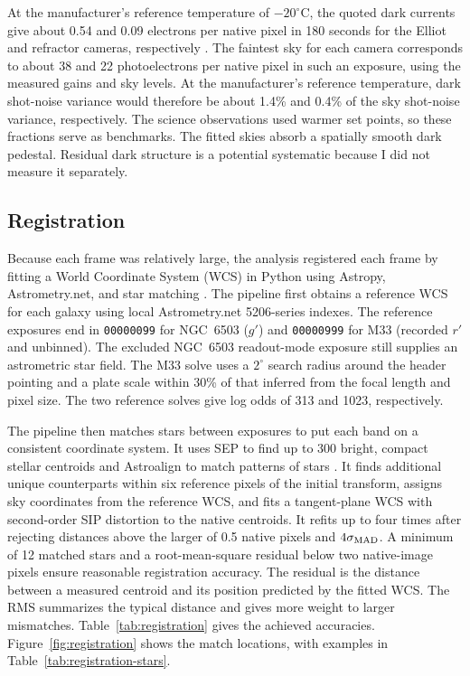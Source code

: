 At the manufacturer's reference temperature of $-20^{\circ}$C, the quoted dark currents give about 0.54 and 0.09 electrons per native pixel in 180 seconds for the Elliot and refractor cameras, respectively \citep{methQHY461,methQHY533}. The faintest sky for each camera corresponds to about 38 and 22 photoelectrons per native pixel in such an exposure, using the measured gains and sky levels. At the manufacturer's reference temperature, dark shot-noise variance would therefore be about 1.4\% and 0.4\% of the sky shot-noise variance, respectively. The science observations used warmer set points, so these fractions serve as benchmarks. The fitted skies absorb a spatially smooth dark pedestal. Residual dark structure is a potential systematic because I did not measure it separately.

\subsection{Registration}
\label{sec:registration}

Because each frame was relatively large, the analysis registered each frame by fitting a World Coordinate System (WCS) in Python using Astropy, Astrometry.net, and star matching \citep{methAstropy,methLang}. The pipeline first obtains a reference WCS for each galaxy using local Astrometry.net 5206-series indexes. The reference exposures end in \texttt{00000099} for NGC~6503 ($g'$) and \texttt{00000999} for M33 (recorded $r'$ and unbinned). The excluded NGC~6503 readout-mode exposure still supplies an astrometric star field. The M33 solve uses a $2^{\circ}$ search radius around the header pointing and a plate scale within 30\% of that inferred from the focal length and pixel size. The two reference solves give log odds of 313 and 1023, respectively.

The pipeline then matches stars between exposures to put each band on a consistent coordinate system. It uses SEP to find up to 300 bright, compact stellar centroids and Astroalign to match patterns of stars \citep{methBarbary,methBeroiz}. It finds additional unique counterparts within six reference pixels of the initial transform, assigns sky coordinates from the reference WCS, and fits a tangent-plane WCS with second-order SIP distortion to the native centroids. It refits up to four times after rejecting distances above the larger of 0.5 native pixels and $4\sigma_{\rm MAD}$. A minimum of 12 matched stars and a root-mean-square residual below two native-image pixels ensure reasonable registration accuracy. The residual is the distance between a measured centroid and its position predicted by the fitted WCS. The RMS summarizes the typical distance and gives more weight to larger mismatches. Table~\ref{tab:registration} gives the achieved accuracies. Figure~\ref{fig:registration} shows the match locations, with examples in Table~\ref{tab:registration-stars}.

